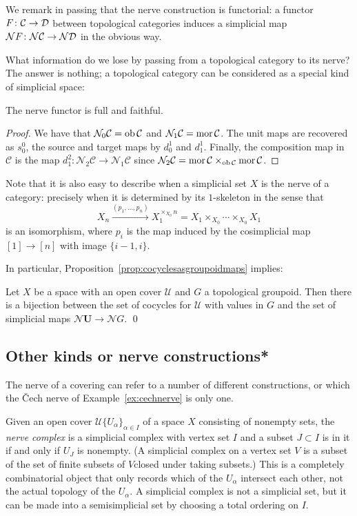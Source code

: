 \documentclass[a4paper,openany]{scrbook}
\renewcommand{\C}{\mathcal C}
\newcommand{\nerve}{\mathcal N}
\begin{document}
We remark in passing that the nerve construction is functorial: a functor $F\colon \C \to \D$ between topological categories induces a simplicial map $\nerve F\colon \nerve\C \to \nerve\D$ in the obvious way. 

What information do we lose by passing from a topological category to its nerve? The answer is nothing; a topological category can be considered as a special kind of simplicial space:

\begin{prop}\label{prop:nervefullyfaithful}
The nerve functor is full and faithful. 
\end{prop}
\begin{proof}
We have that $\nerve_0\C = \ob\C$ and $\nerve_1\C = \mor\C$. The unit maps are recovered as $s^0_0$, the source and target maps by $d^1_0$ and $d^1_1$. Finally, the composition map in $\C$ is the map $d^2_1\colon \nerve_2\C \to \nerve_1\C$ since $\nerve_2\C = \mor\C \times_{\ob\C} \mor\C$.
\end{proof}

Note that it is also easy to describe when a simplicial set $X$ is the nerve of a category: precisely when it is determined by its $1$-skeleton in the sense that
\[
X_n \xrightarrow{(p_1,\dots,p_n)} X_1^{\times_{X_0} n} = X_1 \times_{X_0} \cdots \times_{X_0} X_1
\]
is an isomorphism, where $p_i$ is the map induced by the cosimplicial map $[1] \to [n]$ with image $\{i-1,i\}$.

In particular, Proposition~\ref{prop:cocyclesasgroupoidmaps} implies:

\begin{corollary}
Let $X$ be a space with an open cover $\mathcal U$ and $G$ a topological groupoid. Then there is a bijection between the set of cocycles for $\mathcal U$ with values in $G$ and the set of simplicial maps $\nerve \mathbf U \to \nerve G$. \qed
\end{corollary}

\subsection{Other kinds or nerve constructions*}

The nerve of a covering can refer to a number of different constructions, or which the \v Cech nerve of Example~\ref{ex:cechnerve} is only one.

Given an open cover $\mathcal U\{U_\alpha\}_{\alpha \in I}$ of a space $X$ consisting of nonempty sets, the \emph{nerve complex} is a simplicial complex with vertex set $I$ and a subset $J\subset I$ is in it if and only if $U_J$ is nonempty. (A simplicial complex on a vertex set $V$ is a subset of the set of finite subsets of $V$closed under taking subsets.) This is a completely combinatorial object that only records which of the $U_\alpha$ intersect each other, not the actual topology of the $U_\alpha$.
A simplicial complex is not a simplicial set, but it can be made into a semisimplicial set by choosing a total ordering on $I$.
\end{document}
